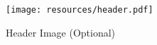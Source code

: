 \usepackage{graphicx}
\begin{figure}[h]
\centering
\texttt{[image: resources/header.pdf]}
\caption{Header Image (Optional)}
\end{figure}
